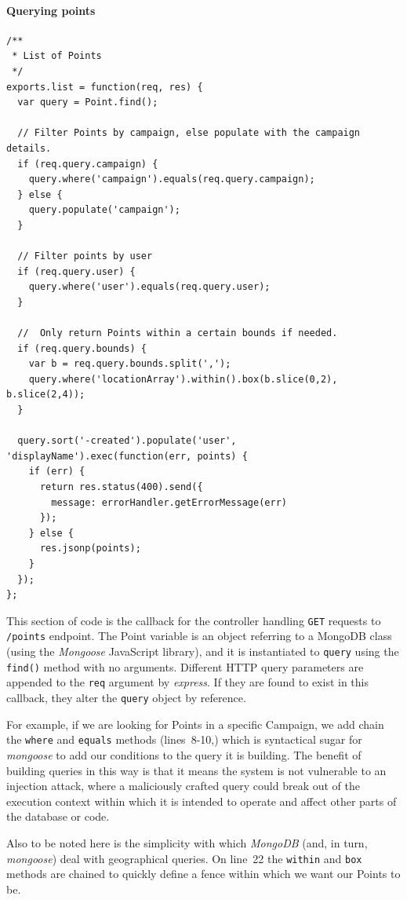 \documentclass{article}
\begin{document}
		\paragraph{Querying points}

		\begin{verbatim}
/**
 * List of Points
 */
exports.list = function(req, res) {
  var query = Point.find();

  // Filter Points by campaign, else populate with the campaign details.
  if (req.query.campaign) {
    query.where('campaign').equals(req.query.campaign);
  } else {
    query.populate('campaign');
  }

  // Filter points by user
  if (req.query.user) {
    query.where('user').equals(req.query.user);
  }

  //  Only return Points within a certain bounds if needed.
  if (req.query.bounds) {
    var b = req.query.bounds.split(',');
    query.where('locationArray').within().box(b.slice(0,2), b.slice(2,4));
  }

  query.sort('-created').populate('user', 'displayName').exec(function(err, points) {
    if (err) {
      return res.status(400).send({
        message: errorHandler.getErrorMessage(err)
      });
    } else {
      res.jsonp(points);
    }
  });
};
	\end{verbatim}

	This section of code is the callback for the controller handling \texttt{GET} requests to \texttt{/points} endpoint. The Point variable is an object referring to a MongoDB class (using the \emph{Mongoose} JavaScript library), and it is instantiated to \texttt{query} using the \texttt{find()} method with no arguments. Different HTTP query parameters are appended to the \texttt{req} argument by \emph{express}. If they are found to exist in this callback, they alter the \texttt{query} object by reference.

	For example, if we are looking for Points in a specific Campaign, we add chain the \texttt{where} and \texttt{equals} methods (lines~8-10,) 		 which is syntactical sugar for \emph{mongoose} to add our conditions to the query it is building. The benefit of building queries in this way is that it means the system is not vulnerable to an injection attack, where a maliciously crafted query could break out of the execution context within which it is intended to operate and affect other parts of the database or code.

	Also to be noted here is the simplicity with which \emph{MongoDB} (and, in turn, \emph{mongoose}) deal with geographical queries. On line~22 the \texttt{within} and \texttt{box} methods are chained to quickly define a fence within which we want our Points to be.
\end{document}
